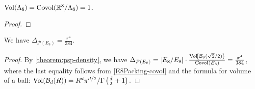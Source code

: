\begin{lemma}\label{E8Packing-covol}
  $\operatorname{Vol}\!\left(\Lambda_8\right) = \mathrm{Covol}(\mathbb{R}^8 / \Lambda_8) = 1$.
\end{lemma}
\begin{proof}
\end{proof}

\begin{theorem}\label{E8Packing-density}\leanok
  We have $\Delta_{\mathcal{P}(E_8)} = \frac{\pi^4}{384}$.
\end{theorem}
\begin{proof}\leanok
  By \cref{theorem:psp-density}, we have $\Delta_{\mathcal{P}(E_8)} = |E_8 / E_8| \cdot \frac{\operatorname{Vol}\!\left(\mathcal{B}_8(\sqrt{2} / 2)\right)}{\mathrm{Covol}(E_8)} = \frac{\pi^4}{384}$, where the last equality follows from \cref{E8Packing-covol} and the formula for volume of a ball: $\operatorname{Vol}\!\left(\mathcal{B}_d(R)\right) = R^d \pi^{d / 2} / \Gamma\left(\frac{d}{2} + 1\right)$.
\end{proof}
